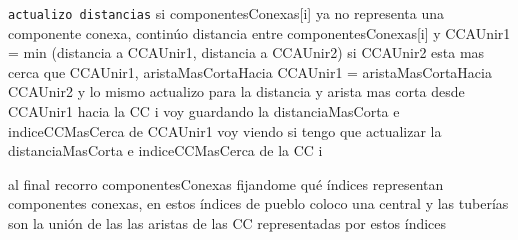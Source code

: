 \documentclass[11pt, a4paper, twoside]{article}
\begin{document}
\begin{algorithm}[H]
\begin{algorithmic}[1]
	\Statex \hspace{0.5cm} \texttt{actualizo distancias}
	  
		\State si componentesConexas[i] ya no representa una componente conexa, continúo  
		\State distancia entre componentesConexas[i] y CCAUnir1 = min (distancia a CCAUnir1, distancia a CCAUnir2)  
        \State si CCAUnir2 esta mas cerca que CCAUnir1, aristaMasCortaHacia CCAUnir1 = aristaMasCortaHacia CCAUnir2  
        \State y lo mismo actualizo para la distancia y arista mas corta desde CCAUnir1 hacia la CC i  
        \State voy guardando la distanciaMasCorta e indiceCCMasCerca de CCAUnir1  
        \State voy viendo si tengo que actualizar la distanciaMasCorta e indiceCCMasCerca de la CC i  
	\EndFor
\EndFor 

\State al final recorro componentesConexas fijandome qué índices representan componentes conexas, 
	   en estos índices de pueblo coloco una central y las tuberías son la unión de las las aristas 
	   de las CC representadas por estos índices  
\\	   
	
\end{algorithmic}
\end{algorithm}
\end{document}
